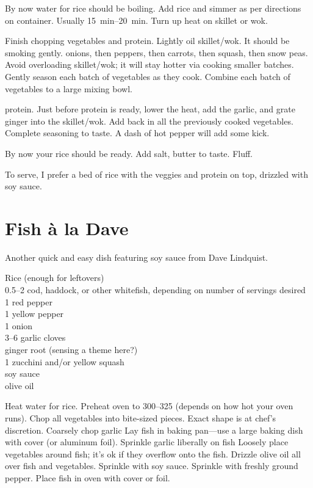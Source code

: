 By now water for rice should be boiling. Add rice and simmer as per directions on container. Usually \SIrange{15}{20}{\minute}. Turn up heat on skillet or wok.

Finish chopping vegetables and protein. Lightly oil skillet/wok. It should be smoking gently. \Saute onions, then peppers, then carrots, then squash, then snow peas. Avoid overloading skillet/wok; it will stay hotter via cooking
smaller batches. Gently season each batch of vegetables as they cook. Combine each batch of \sauteed vegetables to a large mixing bowl.

\Saute protein. Just before protein is ready, lower the heat, add the garlic, and grate ginger into the skillet/wok. Add back in all the previously cooked vegetables. Complete seasoning to taste. A dash of hot pepper will add some kick.

By now your rice should be ready. Add salt, butter to taste. Fluff.

To serve, I prefer a bed of rice with the veggies and protein on top, drizzled
with soy sauce.

\section{Fish \`{a} la Dave
}

\begin{open}
    Another quick and easy dish featuring soy sauce from Dave Lindquist.
\end{open}
\begin{ingredients}
    Rice (enough for leftovers)\\
    \SIrange{0.5}{2}{\pound} cod, haddock, or other whitefish, depending on
    number of servings desired\\
    1 red pepper\\
    1 yellow pepper\\
    1 onion\\
    \numrange{3}{6} garlic cloves\\
    ginger root (sensing a theme here?)\\
    1 zucchini and/or yellow squash\\
    soy sauce\\
    olive oil
\end{ingredients}
Heat water for rice. Preheat oven to \SIrange{300}{325}{\degreeF} (depends on
how hot your oven runs). Chop all vegetables into bite-sized pieces. Exact shape
is at chef's discretion. Coarsely chop garlic Lay fish in baking pan---use a
large baking dish with cover (or aluminum foil). Sprinkle garlic liberally on
fish Loosely place vegetables around fish; it's ok if they overflow onto the
fish. Drizzle olive oil all over fish and vegetables. Sprinkle with soy sauce.
Sprinkle with freshly ground pepper. Place fish in oven with cover or foil.

